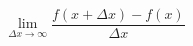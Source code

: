 \documentclass[preview]{standalone}
\begin{document}
\begin{center}
$$\lim_{\Delta x \to \infty}\frac{f(x + \Delta x) - f(x)}{\Delta x}$$
\end{center}
\end{document}
